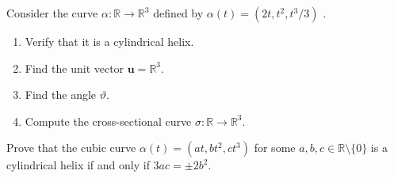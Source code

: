 \documentclass[12 pt, letterpaper]{hmcpset}
\begin{document}
\pagebreak

\begin{problem}[Problem 4.]
	Consider the curve $\alpha : \mathbb{R} \to \mathbb{R}^{3}$  defined by $\alpha(t) = (2t, t^{2}, t^{3}/3)$ .
	\begin{enumerate}
		\item Verify that it is a cylindrical helix.
		\item Find the unit vector $\mathbf{u} = \mathbb{R}^{3}$.
		\item Find the angle $\vartheta$.
		\item Compute the cross-sectional curve $\sigma : \mathbb{R} \to \mathbb{R}^{3}$.
	\end{enumerate}
\end{problem}

\pagebreak

\begin{problem}[Problem 5.]
	Prove that the cubic curve $\alpha(t) = (at, b t^{2}, c t^{3})$ for some $a, b, c \in \mathbb{R} \setminus \{ 0 \}$ is a cylindrical helix if and only if $3ac = \pm 2b^{2}$.
\end{problem}
\end{document}

